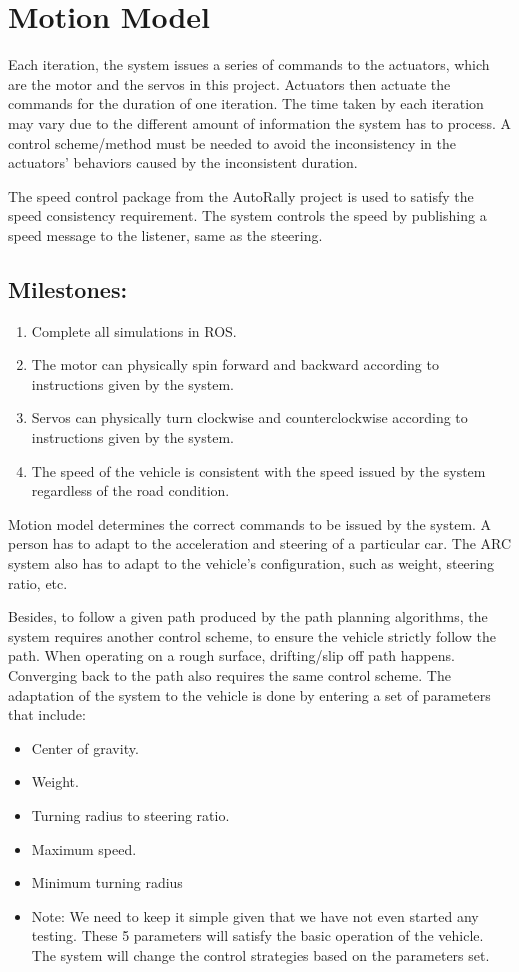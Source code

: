 \documentclass[compsoc,draftclsnofoot,onecolumn,10pt]{IEEEtran}
\begin{document}
\section{Motion Model}
Each iteration, the system issues a series of commands to the actuators, which are the motor and the servos in this project. Actuators then actuate the commands for the duration of one iteration. The time taken by each iteration may vary due to the different amount of information the system has to process. A control scheme/method must be needed to avoid the inconsistency in the actuators’ behaviors caused by the inconsistent duration.\par
The speed control package from the AutoRally project is used to satisfy the speed consistency requirement. The system controls the speed by publishing a speed message to the listener, same as the steering.\par
\subsection{Milestones:}
\begin{enumerate}
	\item Complete all simulations in ROS.
	\item The motor can physically spin forward and backward according to instructions given by the system.
	\item Servos can physically turn clockwise and counterclockwise according to instructions given by the system.
	\item The speed of the vehicle is consistent with the speed issued by the system regardless of the road condition.
\end{enumerate} 

Motion model determines the correct commands to be issued by the system. A person has to adapt to the acceleration and steering of a particular car. The ARC system also has to adapt to the vehicle’s configuration, such as weight, steering ratio, etc.\par
Besides, to follow a given path produced by the path planning algorithms, the system requires another control scheme, to ensure the vehicle strictly follow the path. When operating on a rough surface, drifting/slip off path happens. Converging back to the path also requires the same control scheme.
The adaptation of the system to the vehicle is done by entering a set of parameters that include:\par
\begin{itemize}
	\item Center of gravity.
	\item Weight.
	\item Turning radius to steering ratio.
	\item Maximum speed.
	\item Minimum turning radius
	\item Note: We need to keep it simple given that we have not even started any testing. These 5 parameters will satisfy the basic operation of the vehicle. The system will change the control strategies based on the parameters set.
\end{itemize}
\end{document}
